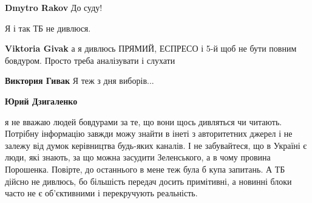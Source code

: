 \begin{itemize}
\begin{itemize}
 
\textbf{Dmytro Rakov} До суду!
\end{itemize}

 
Я і так ТБ не дивлюся.

\begin{itemize}
 
\textbf{Viktoria Givak} а я дивлюсь ПРЯМИЙ, ЕСПРЕСО і 5-й щоб не бути повним бовдуром. Просто треба аналізувати і слухати

 
\textbf{Виктория Гивак}
Я теж з дня виборів...

 
\textbf{Юрий Дзигаленко} 

я не вважаю людей бовдурами за те, що вони щось дивляться чи читають. Потрібну
інформацію завжди можу знайти в інеті з авторитетних джерел і не залежу від
думок керівництва будь-яких каналів. І не забувайтеся, що в Україні є люди, які
знають, за що можна засудити Зеленського, а в чому провина Порошенка. Повірте,
до останнього в мене теж була б купа запитань. А ТБ дійсно не дивлюсь, бо
більшість передач досить примітивні, а новинні блоки часто не є об'єктивними і
перекручують реальність.

\end{itemize}

 

\end{itemize}

